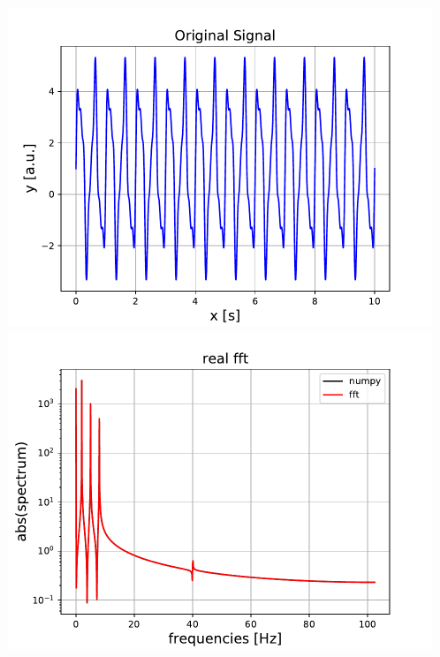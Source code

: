 \documentclass[10pt,a4paper]{article}
\begin{document}
\begin{figure}
\includegraphics[scale=0.5]{img/signal_fft.pdf}
\includegraphics[scale=0.5]{img/sp_fft.pdf}
\end{figure}

\begin{center}
\end{center}
\end{document}
